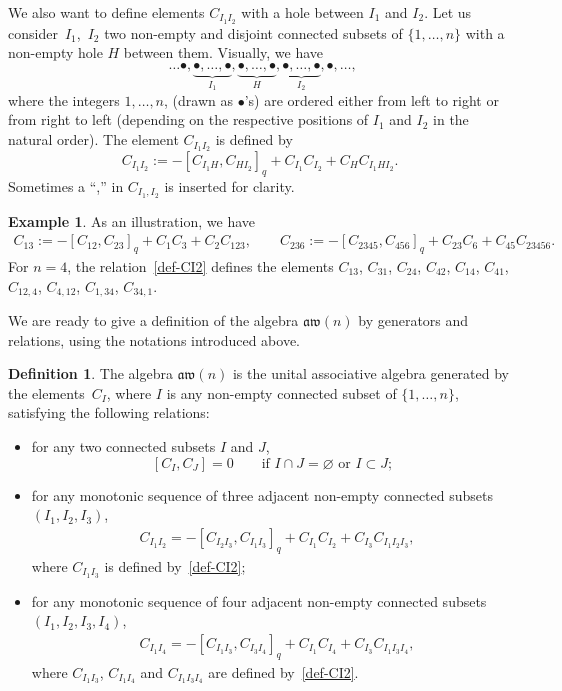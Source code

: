 \documentclass[10pt,a4paper]{amsart}
\numberwithin{equation}{section}
\theoremstyle{definition}
\newtheorem{defi}[theo]{Definition}
\newtheorem{exam}[theo]{Example}
\newcommand{\aw}{\mathfrak{aw}(n)}
\begin{document}
We also want to define elements $C_{I_1I_2}$ with a hole between $I_1$ and $I_2$.
Let us consider~$I_1$,~$I_2$ two non-empty and disjoint connected subsets of $\{1,\dots,n\}$ with a non-empty hole $H$ between them. Visually, we have
\[\ \ \ldots \bullet,\underbrace{\bullet,\dots,\bullet}_{I_1},\underbrace{\bullet,\dots,\bullet}_{H},\underbrace{\bullet,\dots,\bullet}_{I_2},\bullet,\ldots, \]
where the integers $1,\dots,n$, (drawn as $\bullet$'s) are ordered either from left to right or from right to left
(depending on the respective positions of $I_1$ and $I_2$ in the natural order). The element $C_{I_1I_2}$ is defined by
\begin{equation}\label{def-CI2}
C_{I_1I_2}:=-[C_{I_1H},C_{HI_2}]_q+C_{I_1}C_{I_2}+C_{H}C_{I_1HI_2}.
\end{equation}
Sometimes a ``,'' in $C_{I_1,I_2}$ is inserted for clarity.
\begin{exam}%
As an illustration, we have
\begin{gather*}
 C_{13} :=-[C_{12},C_{23}]_q+C_1C_3+C_2C_{123} ,\qquad
 C_{236} :=-[C_{2345},C_{456}]_q+C_{23}C_6+C_{45}C_{23456} .
\end{gather*}
For $n=4$, the relation~\eqref{def-CI2} defines the elements $C_{13}$, $C_{31}$, $C_{24}$, $C_{42}$, $C_{14}$, $C_{41}$, $C_{12,4}$, $C_{4,12}$, $C_{1,34}$, $C_{34,1}$.
\end{exam}
We are ready to give a definition of the algebra $\aw$ by generators and relations, using the notations introduced above.
\begin{defi}\label{prop:def-nico2}
The algebra $\aw$ is the unital associative algebra generated by the ele\-ments~$C_I$, where $I$ is any non-empty connected subset of $\{1,\dots,n\}$,
satisfying the following relations:
\begin{itemize}\itemsep=0pt
\item for any two connected subsets $I$ and $J$,
\begin{equation}\label{relcommv}
 [C_I,C_J]=0\qquad \text{if $I\cap J=\varnothing$ or $I\subset J$;}
\end{equation}

\item for any monotonic sequence of three adjacent non-empty connected subsets $(I_1,I_2,I_3)$,
\begin{align}
 & C_{I_1I_2}=-[C_{I_2I_3},C_{I_1I_3}]_q+C_{I_1}C_{I_2}+C_{I_3}C_{I_1I_2I_3} , \label{relaw31v}
\end{align}
where $C_{I_1I_3}$ is defined by~\eqref{def-CI2};

\item for any monotonic sequence of four adjacent non-empty connected subsets $(I_1,I_2,I_3,I_4)$,
\begin{align}
 & C_{I_1I_4}=-[C_{I_1I_3},C_{I_3I_4}]_q+C_{I_1}C_{I_4}+C_{I_3}C_{I_1I_3I_4} ,\label{relaw41v}
\end{align}
where $C_{I_1I_3}$, $C_{I_1I_4}$ and $C_{I_1I_3I_4}$ are defined by~\eqref{def-CI2}.
\end{itemize}
\end{defi}
\end{document}
